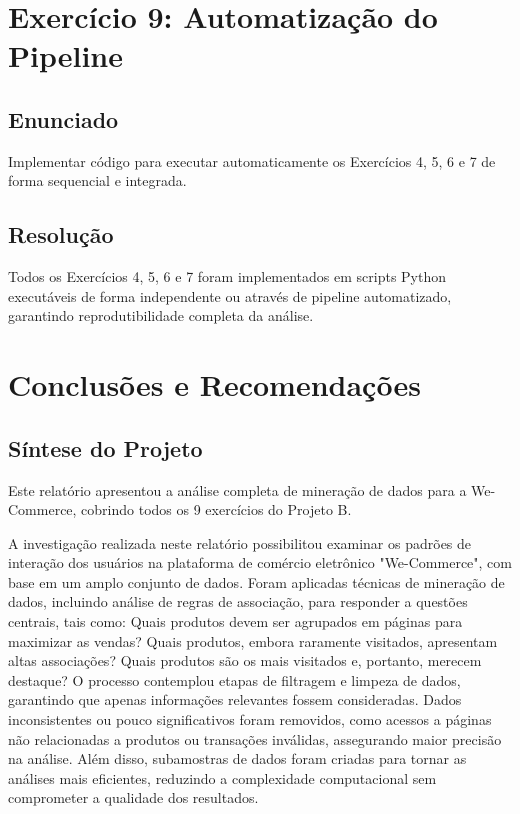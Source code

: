 \documentclass[11pt,a4paper]{article}
\begin{document}
\section{Exercício 9: Automatização do Pipeline}

\subsection{Enunciado}

Implementar código para executar automaticamente os Exercícios 4, 5, 6 e 7 de forma sequencial e integrada.

\subsection{Resolução}

Todos os Exercícios 4, 5, 6 e 7 foram implementados em scripts Python executáveis de forma independente ou através de pipeline automatizado, garantindo reprodutibilidade completa da análise.

\newpage

\section{Conclusões e Recomendações}

\subsection{Síntese do Projeto}

Este relatório apresentou a análise completa de mineração de dados para a We-Commerce, cobrindo todos os 9 exercícios do Projeto B.

A investigação realizada neste relatório possibilitou examinar os padrões de interação dos usuários na plataforma de comércio eletrônico "We-Commerce", com base em um amplo conjunto de dados. Foram aplicadas técnicas de mineração de dados, incluindo análise de regras de associação, para responder a questões centrais, tais como:
Quais produtos devem ser agrupados em páginas para maximizar as vendas? Quais produtos, embora raramente visitados, apresentam altas associações? Quais produtos são os mais visitados e, portanto, merecem destaque? O processo contemplou etapas de filtragem e limpeza de dados, garantindo que apenas informações relevantes fossem consideradas. Dados inconsistentes ou pouco significativos foram removidos, como acessos a páginas não relacionadas a produtos ou transações inválidas, assegurando maior precisão na análise. Além disso, subamostras de dados foram criadas para tornar as análises mais eficientes, reduzindo a complexidade computacional sem comprometer a qualidade dos resultados.
\end{document}
